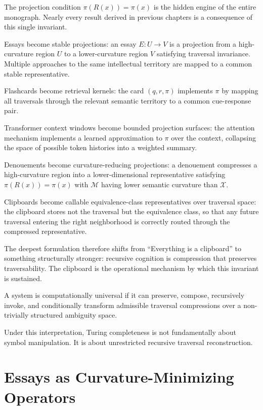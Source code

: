 \documentclass[12pt,oneside]{book}
\newcounter{thesisctr}
\newenvironment{thesis}[1][]{%
  \refstepcounter{thesisctr}%
  \begin{tcolorbox}[
    enhanced,
    breakable,
    colback=cliplight,
    colframe=clipblue,
    fonttitle=\bfseries\small,
    title={Thesis~\thethesisctr\ifx&#1&\else~(#1)\fi},
    left=6pt, right=6pt, top=4pt, bottom=4pt,
    arc=2pt
  ]
}{%
  \end{tcolorbox}
}
\theoremstyle{plain}
\theoremstyle{definition}
\theoremstyle{plain}
\newcommand{\cM}{\mathcal{M}}
\newcommand{\cX}{\mathcal{X}}
\begin{document}
The projection condition $\pi(R(x)) = \pi(x)$ is the hidden engine of the entire monograph. Nearly every result derived in previous chapters is a consequence of this single invariant.

Essays become stable projections: an essay $E : U \to V$ is a projection from a high-curvature region $U$ to a lower-curvature region $V$ satisfying traversal invariance. Multiple approaches to the same intellectual territory are mapped to a common stable representative.

Flashcards become retrieval kernels: the card $(q, r, \pi)$ implements $\pi$ by mapping all traversals through the relevant semantic territory to a common cue-response pair.

Transformer context windows become bounded projection surfaces: the attention mechanism implements a learned approximation to $\pi$ over the context, collapsing the space of possible token histories into a weighted summary.

Denouements become curvature-reducing projections: a denouement compresses a high-curvature region into a lower-dimensional representative satisfying $\pi(R(x)) = \pi(x)$ with $\cM$ having lower semantic curvature than $\cX$.

Clipboards become callable equivalence-class representatives over traversal space: the clipboard stores not the traversal but the equivalence class, so that any future traversal entering the right neighborhood is correctly routed through the compressed representative.

The deepest formulation therefore shifts from ``Everything is a clipboard'' to something structurally stronger: recursive cognition is compression that preserves traversability. The clipboard is the operational mechanism by which this invariant is sustained.

\begin{thesis}[Traversal Universality]
A system is computationally universal if it can preserve, compose, recursively invoke, and conditionally transform admissible traversal compressions over a non-trivially structured ambiguity space.
\end{thesis}

Under this interpretation, Turing completeness is not fundamentally about symbol manipulation. It is about unrestricted recursive traversal reconstruction.

\section{Essays as Curvature-Minimizing Operators}
\end{document}
